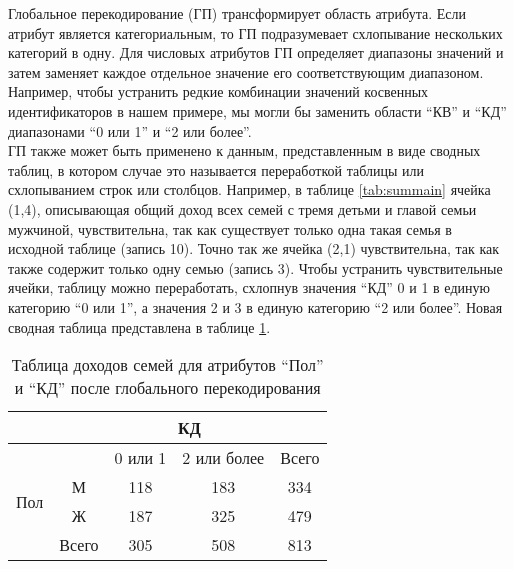Глобальное перекодирование (ГП) трансформирует область атрибута. Если атрибут является категориальным, то ГП подразумевает схлопывание нескольких категорий в одну. Для числовых атрибутов ГП определяет диапазоны значений и затем заменяет каждое отдельное значение его соответствующим диапазоном. Например, чтобы устранить редкие комбинации значений косвенных идентификаторов в нашем примере, мы могли бы заменить области \enquote{КВ} и \enquote{КД} диапазонами \enquote{0 или 1} и \enquote{2 или более}.
\\

ГП также может быть применено к данным, представленным в виде сводных таблиц, в котором случае это называется переработкой таблицы или схлопыванием строк или столбцов. Например, в таблице \ref{tab:summain} ячейка (1,4), описывающая общий доход всех семей с тремя детьми и главой семьи мужчиной, чувствительна, так как существует только одна такая семья в исходной таблице (запись 10). Точно так же ячейка (2,1) чувствительна, так как также содержит только одну семью (запись 3). Чтобы устранить чувствительные ячейки, таблицу можно переработать, схлопнув значения \enquote{КД} 0 и 1 в единую категорию \enquote{0 или 1}, а значения 2 и 3 в единую категорию \enquote{2 или более}. Новая сводная таблица представлена в таблице \ref{tab:GP}.
\\

\begin{table}[h]
\centering
\begin{tabular}{|c|cccc|}
\hline
                        & \multicolumn{4}{c|}{КД}                                                                \\ \hline
\multirow{4}{*}{Пол} & \multicolumn{1}{c|}{}      & \multicolumn{1}{c|}{0 или 1} & \multicolumn{1}{c|}{2 или более} & Всего \\ \cline{2-5} 
& \multicolumn{1}{c|}{М}     & \multicolumn{1}{c|}{118}     & \multicolumn{1}{c|}{183}         & 334   \\ \cline{2-5} 
                        & \multicolumn{1}{c|}{Ж}     & \multicolumn{1}{c|}{187}     & \multicolumn{1}{c|}{325}         & 479   \\ \cline{2-5} 
                        & \multicolumn{1}{c|}{Всего} & \multicolumn{1}{c|}{305}     & \multicolumn{1}{c|}{508}         & 813   \\ \hline
\end{tabular}
\caption{Таблица доходов семей для атрибутов \enquote{Пол} и \enquote{КД} после глобального перекодирования}
\label{tab:GP}
\end{table}

